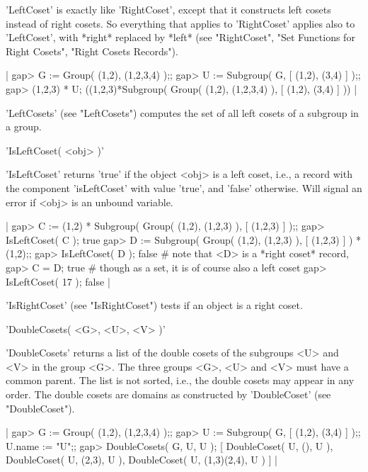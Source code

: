 'LeftCoset' is exactly like  'RightCoset', except that it constructs left
cosets  instead  of   right  cosets.   So  everything  that   applies  to
'RightCoset' applies also to 'LeftCoset', with *right* replaced by *left*
(see  "RightCoset",  "Set  Functions  for  Right  Cosets", "Right  Cosets
Records").

|    gap> G := Group( (1,2), (1,2,3,4) );;
    gap> U := Subgroup( G, [ (1,2), (3,4) ] );;
    gap> (1,2,3) * U;
    ((1,2,3)*Subgroup( Group( (1,2), (1,2,3,4) ), [ (1,2), (3,4) ] )) |

'LeftCosets' (see "LeftCosets") computes the set of all  left cosets of a
subgroup in a group.

%

'IsLeftCoset( <obj> )'

'IsLeftCoset' returns 'true' if the object <obj> is a left coset, i.e., a
record  with the component 'isLeftCoset' with  value 'true', and  'false'
otherwise.  Will signal an error if <obj> is an unbound variable.

|    gap> C := (1,2) * Subgroup( Group( (1,2), (1,2,3) ), [ (1,2,3) ] );;
    gap> IsLeftCoset( C );
    true
    gap> D := Subgroup( Group( (1,2), (1,2,3) ), [ (1,2,3) ] ) * (1,2);;
    gap> IsLeftCoset( D );
    false    # note that <D> is a *right coset* record,
    gap> C = D;
    true     # though as a set, it is of course also a left coset
    gap> IsLeftCoset( 17 );
    false |

'IsRightCoset' (see "IsRightCoset") tests if an object is a right coset.

%

'DoubleCosets( <G>, <U>, <V> )'

'DoubleCosets' returns a list of the double cosets  of the  subgroups <U> and
<V> in the group  <G>. The three groups <G>, <U> and <V> must have a common
parent.  The list is  not sorted,  i.e.,  the  double cosets  may appear in
any  order.  The   double cosets  are  domains  as constructed by 'DoubleCoset'
(see "DoubleCoset").

|    gap> G := Group( (1,2), (1,2,3,4) );;
    gap> U := Subgroup( G, [ (1,2), (3,4) ] );;  U.name := "U";;
    gap> DoubleCosets( G, U, U );
    [ DoubleCoset( U, (), U ), DoubleCoset( U, (2,3), U ), 
      DoubleCoset( U, (1,3)(2,4), U ) ] |

